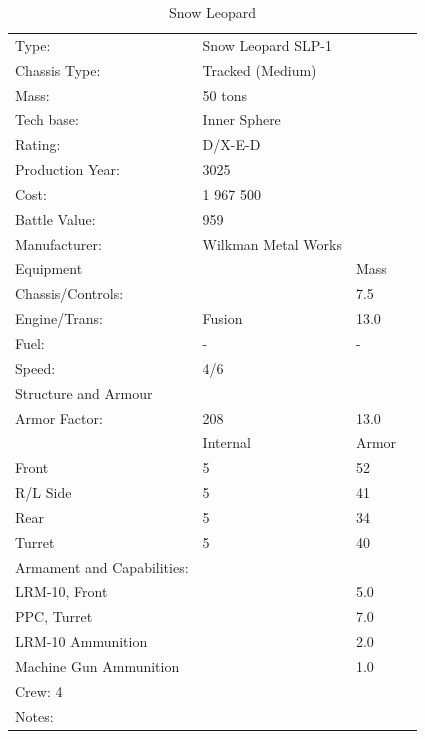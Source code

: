 \documentclass{tufte-book}
\begin{document}
\bigskip
\begin{table}
\begin{minipage}{\textwidth}
\begin{center}
\begin{tabular}{llll}
\toprule
Type: & Snow Leopard SLP-1 & \\
Chassis Type: & Tracked (Medium) & \\
Mass: & 50 tons & \\
Tech base: & Inner Sphere & \\
Rating: & D/X-E-D & \\
Production Year: & 3025 & \\
Cost: & 1 967 500 & \\
Battle Value: & 959 & \\
Manufacturer: & Wilkman Metal Works & \\
Equipment & & Mass \\
\quad Chassis/Controls: & & 7.5 \\
\quad Engine/Trans: & Fusion & 13.0 \\
\quad Fuel: & - & - \\
\quad Speed: & \multicolumn{2}{l}{4/6} \\
Structure and Armour & & \\
\quad Armor Factor: & 208 & 13.0 \\
\quad & Internal & Armor \\
\quad Front & 5 & 52 \\
\quad R/L Side & 5 & 41 \\
\quad Rear & 5 & 34 \\
\quad Turret & 5 & 40 \\

Armament and Capabilities: & & \\
\multicolumn{2}{l}{\quad LRM-10, Front} & 5.0 \\
\multicolumn{2}{l}{\quad PPC, Turret} & 7.0 \\
\multicolumn{2}{l}{\quad LRM-10 Ammunition} & 2.0 \\
\multicolumn{2}{l}{\quad Machine Gun Ammunition} & 1.0 \\


\multicolumn{3}{l}{Crew: 4} \\

Notes: & & \\


\bottomrule
\end{tabular}
\end{center}
\end{minipage}
\caption{Snow Leopard}
\end{table}
\end{document}
